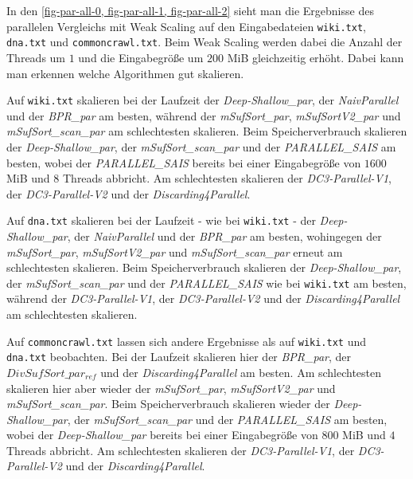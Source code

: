 In den \cref{fig-par-all-0, fig-par-all-1, fig-par-all-2} sieht man die Ergebnisse des parallelen Vergleichs mit Weak Scaling auf den Eingabedateien \texttt{wiki.txt}, \texttt{dna.txt} und \texttt{commoncrawl.txt}. Beim Weak Scaling werden dabei die Anzahl der Threads um $1$ und die Eingabegröße um $200$ MiB gleichzeitig erhöht. Dabei kann man erkennen welche Algorithmen gut skalieren. \par
Auf \texttt{wiki.txt} skalieren bei der Laufzeit der \emph{Deep-Shallow\_par}, der \emph{NaivParallel} und der \emph{BPR\_par} am besten, während der \emph{mSufSort\_par}, \emph{mSufSortV2\_par} und \emph{mSufSort\_scan\_par} am schlechtesten skalieren. Beim Speicherverbrauch skalieren der \emph{Deep-Shallow\_par}, der \emph{mSufSort\_scan\_par} und der \emph{PARALLEL\_SAIS} am besten, wobei der \emph{PARALLEL\_SAIS} bereits bei einer Eingabegröße von $1600$ MiB und $8$ Threads abbricht. Am schlechtesten skalieren der \emph{DC3-Parallel-V1}, der \emph{DC3-Parallel-V2} und der \emph{Discarding4Parallel}. \par
Auf \texttt{dna.txt} skalieren bei der Laufzeit - wie bei \texttt{wiki.txt} - der \emph{Deep-Shallow\_par}, der \emph{NaivParallel} und der \emph{BPR\_par} am besten, wohingegen der \emph{mSufSort\_par}, \emph{mSufSortV2\_par} und \emph{mSufSort\_scan\_par} erneut am schlechtesten skalieren. Beim Speicherverbrauch skalieren der \emph{Deep-Shallow\_par}, der \emph{mSufSort\_scan\_par} und der \emph{PARALLEL\_SAIS} wie bei \texttt{wiki.txt} am besten, während der \emph{DC3-Parallel-V1}, der \emph{DC3-Parallel-V2} und der \emph{Discarding4Parallel} am schlechtesten skalieren. \par
Auf \texttt{commoncrawl.txt} lassen sich andere Ergebnisse als auf \texttt{wiki.txt} und \texttt{dna.txt} beobachten. Bei der Laufzeit skalieren hier der \emph{BPR\_par}, der \emph{$DivSufSort\_par_{ref}$} und der \emph{Discarding4Parallel} am besten. Am schlechtesten skalieren hier aber wieder der \emph{mSufSort\_par}, \emph{mSufSortV2\_par} und \emph{mSufSort\_scan\_par}. Beim Speicherverbrauch skalieren wieder der \emph{Deep-Shallow\_par}, der \emph{mSufSort\_scan\_par} und der \emph{PARALLEL\_SAIS} am besten, wobei der \emph{Deep-Shallow\_par} bereits bei einer Eingabegröße von $800$ MiB und $4$ Threads abbricht. Am schlechtesten skalieren der \emph{DC3-Parallel-V1}, der \emph{DC3-Parallel-V2} und der \emph{Discarding4Parallel}. \par